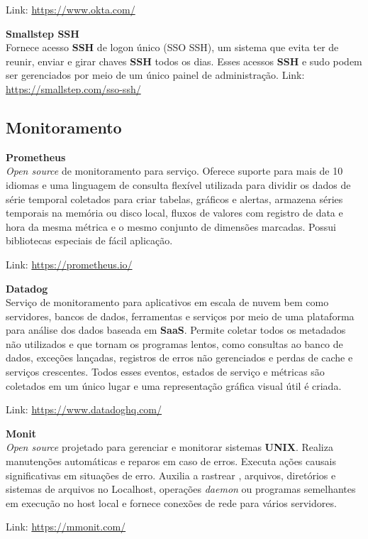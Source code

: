 \documentclass[fleqn,10pt]{SelfArx} %
\begin{document}
Link: \url{https://www.okta.com/}

\textbf{Smallstep SSH} \\
Fornece acesso \textbf{SSH} de logon único (SSO SSH), um sistema que evita ter de reunir, enviar e girar chaves \textbf{SSH} todos os dias. Esses acessos \textbf{SSH} e sudo podem ser gerenciados por meio de um único painel de administração.
Link: \url{https://smallstep.com/sso-ssh/}

\subsection*{Monitoramento}

\textbf{Prometheus} \\
\textit{Open source} de monitoramento para serviço. Oferece suporte para mais de 10 idiomas e uma linguagem de consulta flexível utilizada para dividir os dados de série temporal coletados para criar tabelas, gráficos e alertas, armazena séries temporais na memória ou disco local, fluxos de valores com registro de data e hora da mesma métrica e o mesmo conjunto de dimensões marcadas. Possui bibliotecas especiais de fácil aplicação.

Link: \url{https://prometheus.io/}

\textbf{Datadog} \\
Serviço de monitoramento para aplicativos em escala de nuvem bem como servidores, bancos de dados, ferramentas e serviços por meio de uma plataforma para análise dos dados baseada em \textbf{SaaS}. Permite coletar todos os metadados não utilizados e que tornam os programas lentos, como consultas ao banco de dados, exceções lançadas, registros de erros não gerenciados e perdas de cache e serviços crescentes. Todos esses eventos, estados de serviço e métricas são coletados em um único lugar e uma representação gráfica visual útil é criada.

Link: \url{https://www.datadoghq.com/}

\textbf{Monit} \\
\textit{Open source} projetado para gerenciar e monitorar sistemas \textbf{UNIX}. Realiza manutenções automáticas e reparos em caso de erros. Executa ações causais significativas em situações de erro. Auxilia a rastrear , arquivos, diretórios e sistemas de arquivos no Localhost, operações \textit{daemon} ou programas semelhantes em execução no host local e fornece conexões de rede para vários servidores.

Link: \url{https://mmonit.com/}
\end{document}
